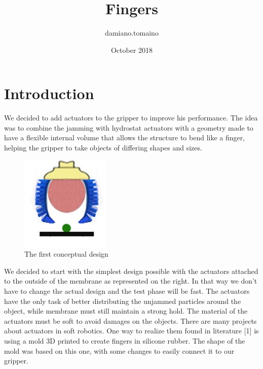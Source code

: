 \documentclass{article}
\title{Fingers}
\author{damiano.tomaino }
\date{October 2018}
\begin{document}
\maketitle

\section{Introduction}

We decided to add actuators to the gripper to improve his performance. The idea was to combine the jamming with hydrostat actuators with a geometry made to have a flexible internal volume that allows the structure to bend like a finger, helping the gripper to take objects of differing shapes and sizes.

\begin{figure}
\includegraphics[scale=0.7]{Pictures/first_idea.jpg}
\caption{The first conceptual design}
\label{fig:firstIdea}
\end{figure} 

We decided to start with the simplest design possible with the actuators attached to the outside of the membrane as represented on the right. In that way we don’t have to change the actual design and the test phase will be fast.
The actuators have the only task of better distributing the unjammed particles around the object, while membrane must still maintain a strong hold. The material of the actuators must be soft to avoid damages on the objects. 
There are many projects about actuators in soft robotics. One way to realize them found in literature [1] is using a mold 3D printed to create fingers in silicone rubber. The shape of the mold was based on this one, with some changes to easily connect it to our gripper.
\end{document}
